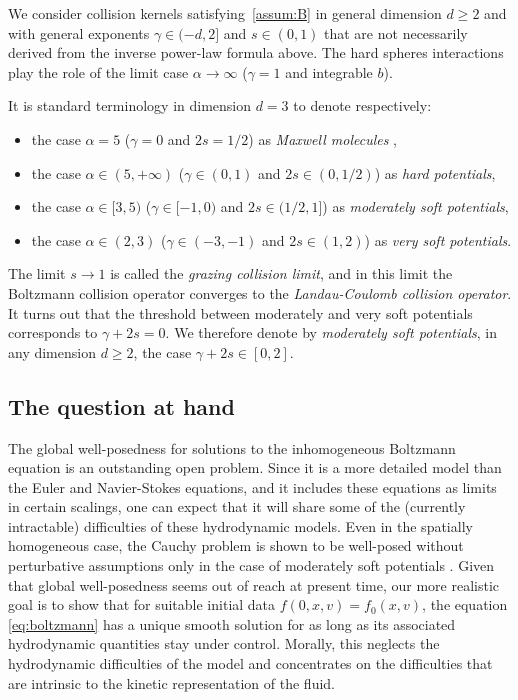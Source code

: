 \documentclass[11pt]{article}
\theoremstyle{plain}
\theoremstyle{definition}
\numberwithin{equation}{section}
\begin{document}
We consider collision kernels satisfying~\eqref{assum:B} in general
dimension $d \ge 2$ and with general exponents $\gamma \in (-d,2]$ and
$s \in (0,1)$ that are not necessarily derived from the inverse
power-law formula above. The hard spheres interactions play the role
of the limit case $\alpha \to \infty$ ($\gamma=1$ and integrable $b$).

It is standard terminology in dimension $d=3$ to denote respectively:
\begin{itemize}
\item
the case $\alpha=5$ ($\gamma=0$ and $2s=1/2$) as \emph{Maxwell
molecules} \cite{Maxwell1867},
\item
the case $\alpha \in (5,+\infty)$ ($\gamma \in (0,1)$ and
$2s \in (0,1/2)$) as \emph{hard potentials},
\item
the case $\alpha \in [3,5)$ ($\gamma \in [-1,0)$ and
$2s \in (1/2,1]$) as \emph{moderately soft potentials},
\item
the case $\alpha \in (2,3)$ ($\gamma \in (-3,-1)$ and
$2s \in (1,2)$) as \emph{very soft potentials}.
\end{itemize}

The limit $s \to 1$ is called the \emph{grazing collision limit}, and
in this limit the Boltzmann collision operator converges to
the \emph{Landau-Coulomb collision operator}. It turns out that the
threshold between moderately and very soft potentials corresponds to
\hbox{$\gamma + 2s =0$}. We therefore denote by \emph{moderately soft
potentials}, in any dimension $d \ge 2$, the case
$\gamma + 2s \in [0,2]$.

\subsection{The question at hand}

The global well-posedness for solutions to the inhomogeneous Boltzmann
equation is an outstanding open problem. Since it is a more detailed
model than the Euler and Navier-Stokes equations, and it includes
these equations as limits in certain scalings, one can expect that it
will share some of the (currently intractable) difficulties of these
hydrodynamic models. Even in the spatially homogeneous case, the
Cauchy problem is shown to be well-posed without perturbative
assumptions only in the case of moderately soft potentials
\cite{MR2525118}. Given that global well-posedness seems out of reach
at present time, our more realistic goal is to show that for suitable
initial data $f(0,x,v) = f_0(x,v)$, the equation \eqref{eq:boltzmann}
has a unique smooth solution for as long as its associated
hydrodynamic quantities stay under control. Morally, this neglects the
hydrodynamic difficulties of the model and concentrates on the
difficulties that are intrinsic to the kinetic representation of the
fluid.
\end{document}
